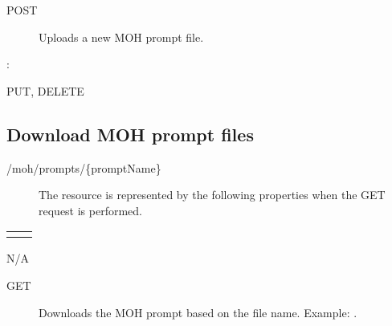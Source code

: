 \documentclass[letterpaper,10pt,english]{sphinxmanual}
\begin{document}
\begin{sphinxVerbatim}[commandchars=\\\{\}]
\end{sphinxVerbatim}
\begin{description}
\item[{ POST}] \leavevmode
Uploads a new MOH prompt file.

\end{description}

:

\begin{sphinxVerbatim}[commandchars=\\\{\}]
\end{sphinxVerbatim}

 PUT, DELETE


\subsection{Download MOH prompt files}
\label{\detokenize{restapi:download-moh-prompt-files}}
 /moh/prompts/\{promptName\}
\begin{description}
\item[{}] \leavevmode
The resource is represented by the following properties when the GET request is performed.

\end{description}


\begin{savenotes}\sphinxattablestart
\centering
\begin{tabulary}{\linewidth}[t]{|T|T|}
\hline

&
\\
\hline&\\
\hline
\end{tabulary}
\par
\sphinxattableend\end{savenotes}

 N/A
\begin{description}
\item[{ GET}] \leavevmode
Downloads the MOH prompt based on the file name. Example: .

\end{description}
\end{document}
